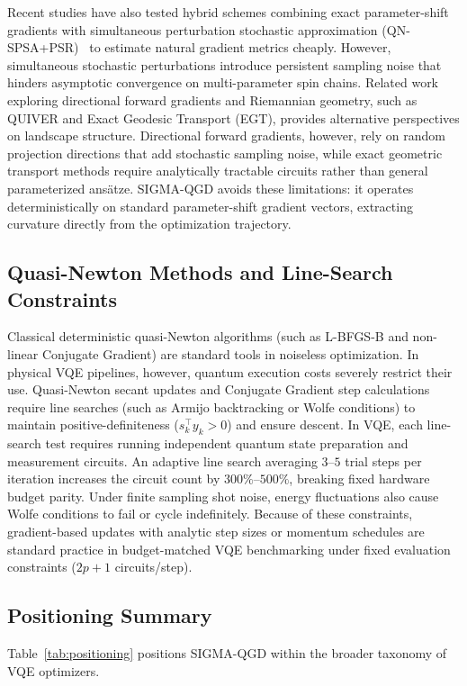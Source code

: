 \documentclass[11pt,a4paper]{article}
\begin{document}
Recent studies have also tested hybrid schemes combining exact parameter-shift gradients with simultaneous perturbation stochastic approximation (QN-SPSA+PSR)~\cite{qnspsa_psr_2024} to estimate natural gradient metrics cheaply. However, simultaneous stochastic perturbations introduce persistent sampling noise that hinders asymptotic convergence on multi-parameter spin chains. Related work exploring directional forward gradients and Riemannian geometry, such as QUIVER and Exact Geodesic Transport (EGT), provides alternative perspectives on landscape structure. Directional forward gradients, however, rely on random projection directions that add stochastic sampling noise, while exact geometric transport methods require analytically tractable circuits rather than general parameterized ans\"atze. SIGMA-QGD avoids these limitations: it operates deterministically on standard parameter-shift gradient vectors, extracting curvature directly from the optimization trajectory.

\subsection{Quasi-Newton Methods and Line-Search Constraints}
Classical deterministic quasi-Newton algorithms (such as L-BFGS-B and non-linear Conjugate Gradient) are standard tools in noiseless optimization. In physical VQE pipelines, however, quantum execution costs severely restrict their use. Quasi-Newton secant updates and Conjugate Gradient step calculations require line searches (such as Armijo backtracking or Wolfe conditions) to maintain positive-definiteness ($s_k^\top y_k > 0$) and ensure descent. In VQE, each line-search test requires running independent quantum state preparation and measurement circuits. An adaptive line search averaging $3\text{--}5$ trial steps per iteration increases the circuit count by $300\%\text{--}500\%$, breaking fixed hardware budget parity. Under finite sampling shot noise, energy fluctuations also cause Wolfe conditions to fail or cycle indefinitely. Because of these constraints, gradient-based updates with analytic step sizes or momentum schedules are standard practice in budget-matched VQE benchmarking under fixed evaluation constraints ($2p+1$ circuits/step).

\subsection{Positioning Summary}
Table~\ref{tab:positioning} positions SIGMA-QGD within the broader taxonomy of VQE optimizers.
\end{document}
